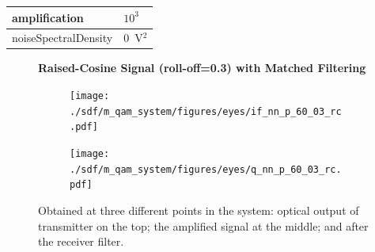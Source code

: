 \begin{refsection}
\begin{table}[H]
\begin{tabular}{|l|l|}
		amplification          & $10^3$                                                     \\ \hline
		noiseSpectralDensity   & $0$~V$^2$                             					\\ \hline
	\end{tabular}
\end{table}
\begin{figure}[H]
	
		\centering
	\textbf{Raised-Cosine Signal (roll-off=0.3) with Matched Filtering}
	\begin{minipage}{\linewidth}
		\centering
	\begin{subfigure}{.45\textwidth}
		\centering
		\texttt{[image: ./sdf/m\_qam\_system/figures/eyes/if\_nn\_p\_60\_03\_rc.pdf]}
	\end{subfigure}
	\begin{subfigure}{.45\textwidth}
		\centering
		\texttt{[image: ./sdf/m\_qam\_system/figures/eyes/q\_nn\_p\_60\_03\_rc.pdf]}
	\end{subfigure}
	
	\caption{
		Obtained at
		three different points in the system: optical output of transmitter on the top;
		the amplified signal at the middle; and
		after the receiver filter.
		\label{fig:eyes_nn_rc_03}}
	\end{minipage}
\end{figure}


\end{refsection}
